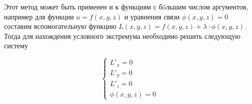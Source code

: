 \begin{remark}
  Этот метод может быть применен и к функциям с б\'oльшим числом аргументов,
  например для функции \(u = f(x, y, z)\) и уравнения связи \(\phi(x, y, z) =
  0\) составим вспомогательную функцию \(L(x, y, z) = f(x, y, z) + \lambda \cdot
  \phi(x, y, z)\). Тогда для нахождения условного экстремума необходимо решить
  следующую систему

  \begin{equation*}
    \begin{cases}
      L'_x = 0 \\
      L'_y = 0 \\
      L'_z = 0 \\
      \phi(x, y, z) = 0
    \end{cases}
  \end{equation*}
\end{remark}
